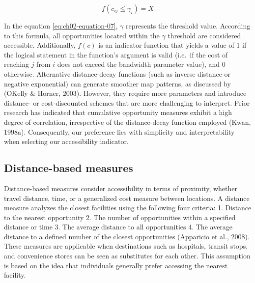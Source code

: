 \documentclass[
11pt, %
oneside, %
english, %
singlespacing, %
]{macthesis} %
\begin{document}
\begin{equation}
f(c_{ij} \le \gamma _i) = X
\label{eq:ch02-equation-07}
\end{equation}

In the equation \ref{eq:ch02-equation-07}, \(\gamma\) represents the threshold value. According to this formula, all opportunities located within the \(\gamma\) threshold are considered accessible. Additionally, \(f(c)\) is an indicator function that yields a value of 1 if the logical statement in the function's argument is valid (i.e.~if the cost of reaching \(j\) from \(i\) does not exceed the bandwidth parameter value), and 0 otherwise. Alternative distance-decay functions (such as inverse distance or negative exponential) can generate smoother map patterns, as discussed by (OKelly \& Horner, 2003). However, they require more parameters and introduce distance- or cost-discounted schemes that are more challenging to interpret. Prior research has indicated that cumulative opportunity measures exhibit a high degree of correlation, irrespective of the distance-decay function employed (Kwan, 1998a). Consequently, our preference lies with simplicity and interpretability when selecting our accessibility indicator.

\subsection{Distance-based measures}\label{distance-based-measures}

Distance-based measures consider accessibility in terms of proximity, whether travel distance, time, or a generalized cost measure between locations. A distance measure analyzes the closest facilities using the following four criteria:
1. Distance to the nearest opportunity
2. The number of opportunities within a specified distance or time
3. The average distance to all opportunities
4. The average distance to a defined number of the closest opportunities (Apparicio et al., 2008). These measures are applicable when destinations such as hospitals, transit stops, and convenience stores can be seen as substitutes for each other. This assumption is based on the idea that individuals generally prefer accessing the nearest facility.
\end{document}
